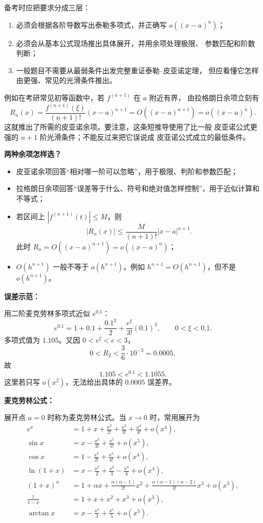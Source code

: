 \begin{knowledgeBox}
备考时应把要求分成三层：
\begin{enumerate}
  \item 必须会根据各阶导数写出泰勒多项式，并正确写
  \(o((x-a)^n)\)；
  \item 必须会从基本公式现场推出具体展开，并用余项处理极限、
  参数匹配和阶数判断；
  \item 一般题目不需要从最弱条件出发完整重证泰勒--皮亚诺定理，
  但应看懂它怎样由更强、常见的光滑条件推出。
\end{enumerate}
例如在考研常见初等函数中，若 \(f^{(n+1)}\) 在 \(a\) 附近有界，
由拉格朗日余项立刻有
\[
R_n(x)
=\frac{f^{(n+1)}(\xi)}{(n+1)!}(x-a)^{n+1}
=O((x-a)^{n+1})
=o((x-a)^n).
\]
这就推出了所需的皮亚诺余项。要注意，这条短推导使用了比一般
皮亚诺公式更强的 \(n+1\) 阶光滑条件；不能反过来把它误说成
皮亚诺公式成立的最低条件。

\textbf{两种余项怎样选？}

\begin{itemize}
  \item 皮亚诺余项回答“相对哪一阶可以忽略”，用于极限、判阶和参数匹配；
  \item 拉格朗日余项回答“误差等于什么、符号和绝对值怎样控制”，用于近似计算和不等式；
  \item 若区间上 \(|f^{(n+1)}(t)|\le M\)，则
  \[
  |R_n(x)|\le\frac{M}{(n+1)!}|x-a|^{n+1}.
  \]
  此时 \(R_n=O((x-a)^{n+1})=o((x-a)^n)\)；
  \item \(O(h^{n+1})\) 一般不等于 \(o(h^{n+1})\)。例如
  \(h^{n+1}=O(h^{n+1})\)，但不是 \(o(h^{n+1})\)。
\end{itemize}

\textbf{误差示范：}

用二阶麦克劳林多项式近似 \(e^{0.1}\)：
\[
e^{0.1}=1+0.1+\frac{0.1^2}{2}
+\frac{e^\xi}{3!}(0.1)^3,\qquad 0<\xi<0.1.
\]
多项式值为 \(1.105\)。又因 \(0<e^\xi<e<3\)，
\[
0<R_2<\frac{3}{6}\cdot10^{-3}=0.0005,
\]
故
\[
1.105<e^{0.1}<1.1055.
\]
这里若只写 \(o(x^2)\)，无法给出具体的 \(0.0005\) 误差界。

\textbf{麦克劳林公式：}

展开点 \(a=0\) 时称为麦克劳林公式。当 \(x\to0\) 时，常用展开为
\[
\begin{aligned}
e^x&=1+x+\frac{x^2}{2!}+\frac{x^3}{3!}+\frac{x^4}{4!}+o(x^4),\\
\sin x&=x-\frac{x^3}{3!}+\frac{x^5}{5!}+o(x^5),\\
\cos x&=1-\frac{x^2}{2!}+\frac{x^4}{4!}+o(x^4),\\
\ln(1+x)&=x-\frac{x^2}{2}+\frac{x^3}{3}-\frac{x^4}{4}+o(x^4),\\
(1+x)^\alpha&=1+\alpha x+\frac{\alpha(\alpha-1)}{2!}x^2
+\frac{\alpha(\alpha-1)(\alpha-2)}{3!}x^3+o(x^3),\\
\frac{1}{1-x}&=1+x+x^2+x^3+o(x^3),\\
\arctan x&=x-\frac{x^3}{3}+\frac{x^5}{5}+o(x^5).
\end{aligned}
\]


\end{knowledgeBox}
